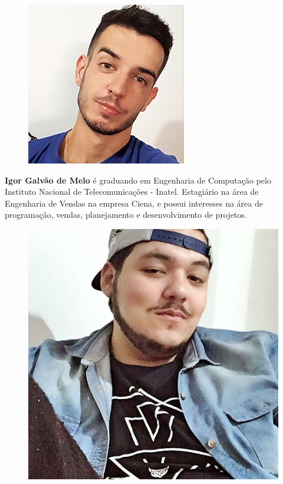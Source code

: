 \begin{figure}
\includegraphics[width=\linewidth]{figuras/autor_igor.png}
\end{figure}

\textbf{Igor Galvão de Melo} é graduando em Engenharia de Computação pelo Instituto Nacional de Telecomunicações - Inatel. Estagiário na área de Engenharia de Vendas na empresa Ciena, e possui interesses na área de programação, vendas, planejamento e desenvolvimento de projetos.\newline

\begin{figure}
\includegraphics[width=\linewidth]{figuras/autor_lucas.jpg}
\end{figure}


